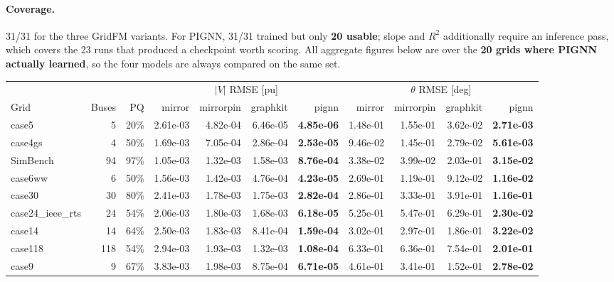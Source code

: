 \documentclass[10pt]{article}
\begin{document}
\paragraph{Coverage.} 31/31 for the three GridFM variants. For PIGNN, 31/31
trained but only \textbf{20 usable}; slope and $R^2$ additionally require an
inference pass, which covers the 23 runs that produced a checkpoint worth
scoring. All aggregate figures below are over the \textbf{20 grids where PIGNN
actually learned}, so the four models are always compared on the same set.

\begin{landscape}
\begin{table}[H]
\centering\scriptsize
\begin{tabular}{lrr rrrr rrrr}
\toprule
 & & & \multicolumn{4}{c}{$|V|$ RMSE [pu]} & \multicolumn{4}{c}{$\theta$ RMSE [deg]} \\
\cmidrule(lr){4-7}\cmidrule(lr){8-11}
Grid & Buses & PQ & mirror & mirrorpin & graphkit & pignn & mirror & mirrorpin & graphkit & pignn \\
\midrule
case5 & 5 & 20\% & 2.61e-03 & 4.82e-04 & 6.46e-05 & \textbf{4.85e-06} & 1.48e-01 & 1.55e-01 & 3.62e-02 & \textbf{2.71e-03} \\
case4gs & 4 & 50\% & 1.69e-03 & 7.05e-04 & 2.86e-04 & \textbf{2.53e-05} & 9.46e-02 & 1.45e-01 & 2.79e-02 & \textbf{5.61e-03} \\
SimBench & 94 & 97\% & 1.05e-03 & 1.32e-03 & 1.58e-03 & \textbf{8.76e-04} & 3.38e-02 & 3.99e-02 & 2.03e-01 & \textbf{3.15e-02} \\
case6ww & 6 & 50\% & 1.56e-03 & 1.42e-03 & 4.76e-04 & \textbf{4.23e-05} & 2.69e-01 & 1.19e-01 & 9.12e-02 & \textbf{1.16e-02} \\
case30 & 30 & 80\% & 2.41e-03 & 1.78e-03 & 1.75e-03 & \textbf{2.82e-04} & 2.86e-01 & 3.33e-01 & 3.91e-01 & \textbf{1.16e-01} \\
case24\_ieee\_rts & 24 & 54\% & 2.06e-03 & 1.80e-03 & 1.68e-03 & \textbf{6.18e-05} & 5.25e-01 & 5.47e-01 & 6.29e-01 & \textbf{2.30e-02} \\
case14 & 14 & 64\% & 2.50e-03 & 1.83e-03 & 8.41e-04 & \textbf{1.59e-04} & 3.02e-01 & 2.97e-01 & 1.86e-01 & \textbf{3.22e-02} \\
case118 & 118 & 54\% & 2.94e-03 & 1.93e-03 & 1.32e-03 & \textbf{1.08e-04} & 6.33e-01 & 6.36e-01 & 7.54e-01 & \textbf{2.01e-01} \\
case9 & 9 & 67\% & 3.83e-03 & 1.98e-03 & 8.75e-04 & \textbf{6.71e-05} & 4.61e-01 & 3.41e-01 & 1.52e-01 & \textbf{2.78e-02} \\

\end{tabular}
\end{table}
\end{landscape}
\end{document}
